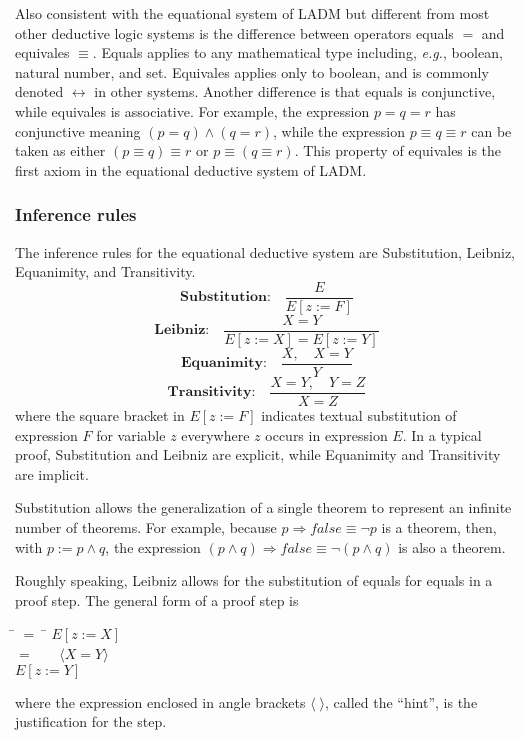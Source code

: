 \documentclass[12pt, fleqn, leqno]{article}
\newcommand{\lgap}{2pt}                             %
\newcommand{\mymathindent}{24pt}                    %
\newcommand{\impl}{\ensuremath{\Rightarrow}}        %
\newcommand{\Gll} {\langle}                         %
\newcommand{\Ggg} {\rangle}                         %
\newcommand{\Hint}[1]     {\ \ \ $\Gll              \mbox{#1} \Ggg$ }   %
\begin{document}
Also consistent with the equational system of LADM but different from most other deductive logic systems
is the difference between operators equals $=$ and equivales $\equiv$.
Equals applies to any mathematical type including, {\itshape e.g.\/}, boolean, natural number, and set.
Equivales applies only to boolean, and is commonly denoted $\leftrightarrow$ in other systems.
Another difference is that equals is conjunctive, while equivales is associative.
For example, the expression $p = q = r$ has conjunctive meaning $(p = q) \land (q = r)$, while the expression $p \equiv q \equiv r$
can be taken as either $(p \equiv q) \equiv r$ or $p \equiv (q \equiv r)$.
This property of equivales is the first axiom in the equational deductive system of LADM.

\subsubsection*{Inference rules}

The inference rules for the equational deductive system are Substitution, Leibniz, Equanimity, and Transitivity.
\[
\textbf{Substitution:}\quad \frac{E}{E[z:=F]}
\]
\[
\textbf{Leibniz:}\quad \frac{X=Y}{E[z:=X]=E[z:=Y]}
\]
\[
\textbf{Equanimity:}\quad \frac{X, \quad X=Y}{Y}
\]
\[
\textbf{Transitivity:}\quad \frac{X=Y, \quad Y=Z}{X=Z}
\]
where the square bracket in $E[z:=F]$ indicates textual substitution of expression $F$ for variable $z$
everywhere $z$ occurs in expression $E$.
In a typical proof, Substitution and Leibniz are explicit, while Equanimity and Transitivity are implicit.

Substitution allows the generalization of a single theorem to represent an infinite number of theorems.
For example, because $p\impl false \equiv \lnot p$ is a theorem, then, with $p:=p\land q$, the expression
$(p\land q)\impl false \equiv \lnot (p\land q)$ is also a theorem.

Roughly speaking, Leibniz allows for the substitution of equals for equals in a proof step.
The general form of a proof step is
\begin{tabbing}
\hspace{\mymathindent} \= $= \;$ \=  \kill
  \> \>   $E[z:=X]$\\[\lgap]
  \> $=$  \>  \Hint{$X=Y$} \\[\lgap]
  \> \>   $E[z:=Y]$
\end{tabbing}
where the expression enclosed in angle brackets $\Gll\;\Ggg$, called the ``hint'', is the justification for the step.
\end{document}
